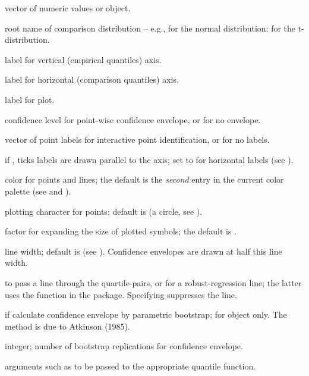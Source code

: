 \documentclass{article}
\begin{document}
\begin{Arguments}
\begin{ldescription}
\item[\code{x}] vector of numeric values or  object.
\item[\code{distribution}] root name of comparison distribution -- e.g.,  for the
normal distribution;  for the t-distribution.
\item[\code{ylab}] label for vertical (empirical quantiles) axis.
\item[\code{xlab}] label for horizontal (comparison quantiles) axis.
\item[\code{main}] label for plot.
\item[\code{envelope}] confidence level for point-wise confidence envelope, or 
 for no envelope.
\item[\code{labels}] vector of point labels for interactive point identification,
or  for no labels.
\item[\code{las}] if , ticks labels are drawn parallel to the
axis; set to  for horizontal labels (see ).
\item[\code{col}] color for points and lines; the default is the \emph{second} entry
in the current color palette (see 
and ).
\item[\code{pch}] plotting character for points; default is  
(a circle, see ).
\item[\code{cex}] factor for expanding the size of plotted symbols; the default is
.
\item[\code{lwd}] line width; default is  (see ).
Confidence envelopes are drawn at half this line width.
\item[\code{line}]  to pass a line through the quartile-pairs, or
 for a robust-regression line; the latter uses the 
function in the  package. Specifying  suppresses the line.
\item[\code{simulate}] if  calculate confidence envelope by parametric bootstrap;
for  object only. The method is due to Atkinson (1985).
\item[\code{reps}] integer; number of bootstrap replications for confidence envelope.
\item[\code{...}] arguments such as  to be passed to the appropriate quantile function.
\end{ldescription}
\end{Arguments}
\end{document}
